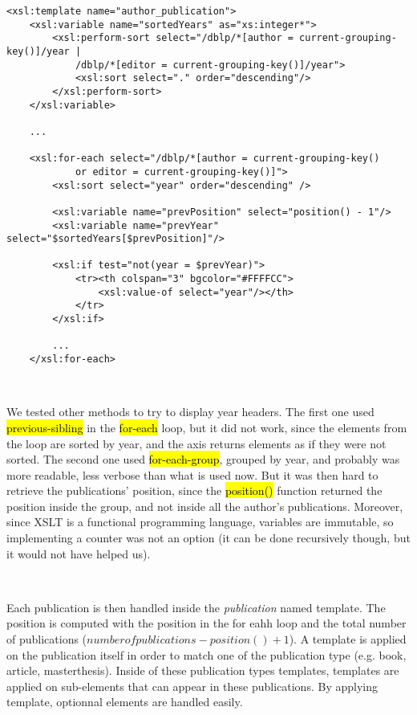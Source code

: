 \begin{lstlisting}
<xsl:template name="author_publication">
    <xsl:variable name="sortedYears" as="xs:integer*">
        <xsl:perform-sort select="/dblp/*[author = current-grouping-key()]/year |
            /dblp/*[editor = current-grouping-key()]/year">
            <xsl:sort select="." order="descending"/>
        </xsl:perform-sort>
    </xsl:variable>

    ...

    <xsl:for-each select="/dblp/*[author = current-grouping-key()
            or editor = current-grouping-key()]">
        <xsl:sort select="year" order="descending" />

        <xsl:variable name="prevPosition" select="position() - 1"/>
        <xsl:variable name="prevYear" select="$sortedYears[$prevPosition]"/>

        <xsl:if test="not(year = $prevYear)">
            <tr><th colspan="3" bgcolor="#FFFFCC">
                <xsl:value-of select="year"/></th>
            </tr>
        </xsl:if>

        ...
    </xsl:for-each>
\end{lstlisting}
\

\begin{framewarning}
We tested other methods to try to display year headers. The first one used
\hl{previous-sibling} in the \hl{for-each} loop, but it did not work, since the
elements from the loop are sorted by year, and the axis returns elements as if
they were not sorted. The second one used \hl{for-each-group}, grouped by year,
and probably was more readable, less verbose than what is used now. But it was
then hard to retrieve the publications' position, since the \hl{position()}
function returned the position inside the group, and not inside all the author's
publications. Moreover, since XSLT is a functional programming language, variables
are immutable, so implementing a counter was not an option (it can be done
recursively though, but it would not have helped us).
\end{framewarning}
\

Each publication is then handled inside the \emph{publication} named template.
The position is computed with the position in the for eahh loop and the total
number of publications ($number of publications - position() + 1$). A template
is applied on the publication itself in order to match one of the publication
type (e.g. book, article, masterthesis). Inside of these publication types
templates, templates are applied on sub-elements that can appear in these
publications. By applying template, optionnal elements are handled easily.
\newpage

